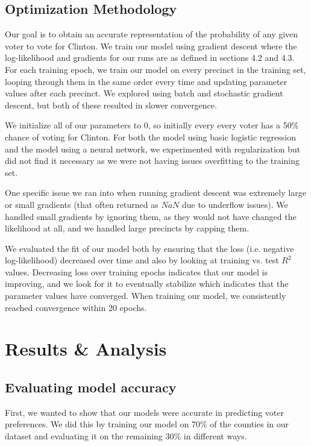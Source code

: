\documentclass[10pt, letterpaper]{article}
\begin{document}
\begin{multicols}{2}
\subsection{Optimization Methodology}

Our goal is to obtain an accurate representation of the probability of any given voter to vote for Clinton. We train our model using gradient descent where the log-likelihood and gradients for our runs are as defined in sections 4.2 and 4.3. For each training epoch, we train our model on every precinct in the training set, looping through them in the same order every time and updating parameter values after each precinct. We explored using batch and stochastic gradient descent, but both of these resulted in slower convergence.

We initialize all of our parameters to 0, so initially every every voter has a 50\% chance of voting for Clinton. For both the model using basic logistic regression and the model using a neural network, we experimented with regularization but did not find it necessary as we were not having issues overfitting to the training set.

One specific issue we ran into when running gradient descent was extremely large or small gradients (that often returned as $NaN$ due to underflow issues). We handled small gradients by ignoring them, as they would not have changed the likelihood at all, and we handled large precincts by capping them.

We evaluated the fit of our model both by ensuring that the loss (i.e. negative log-likelihood) decreased over time and also by looking at training vs. test $R^2$ values. Decreasing loss over training epochs indicates that our model is improving, and we look for it to eventually stabilize which indicates that the parameter values have converged. When training our model, we consistently reached convergence within 20 epochs.

\section{Results \& Analysis}

\subsection{Evaluating model accuracy}
First, we wanted to show that our models were accurate in predicting voter preferences. We did this by training our model on 70\% of the counties in our dataset and evaluating it on the remaining 30\% in different ways.


\end{multicols}
\end{document}
